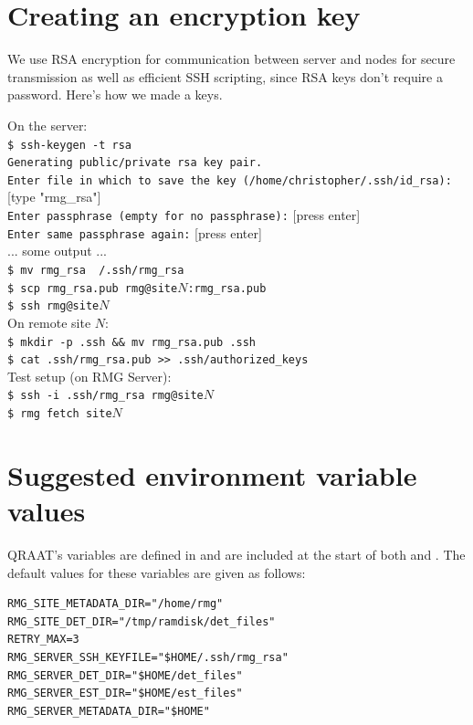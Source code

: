 \documentclass[letter]{article}
\begin{document}
\begin{appendices}
\section{Creating an encryption key}
We use RSA encryption for communication between server and nodes for secure transmission
as well as efficient SSH scripting, since RSA keys don't require a password. 
Here's how we made a keys.

On the server:\\
\texttt{\$ ssh-keygen -t rsa}\\
\texttt{Generating public/private rsa key pair.}\\
\texttt{Enter file in which to save the key (/home/christopher/.ssh/id\_rsa):} [type "rmg\_rsa"]\\
\texttt{Enter passphrase (empty for no passphrase):} [press enter]\\
\texttt{Enter same passphrase again:} [press enter]\\
   ... some output ... \\
\texttt{\$ mv rmg\_rsa ~/.ssh/rmg\_rsa}\\
\texttt{\$ scp rmg\_rsa.pub rmg@site}$N$\texttt{:rmg\_rsa.pub}\\
\texttt{\$ ssh rmg@site}$N$\\

On remote site $N$:\\
\texttt{\$ mkdir -p .ssh \&\& mv rmg\_rsa.pub .ssh}\\
\texttt{\$ cat .ssh/rmg\_rsa.pub >> .ssh/authorized\_keys}\\

Test setup (on RMG Server):\\
\texttt{\$ ssh -i .ssh/rmg\_rsa rmg@site}$N$\\
\texttt{\$ rmg fetch site}$N$\\

\section{Suggested environment variable values}
QRAAT's variables are defined in  and are included at the start of both 
 and . The default values for these variables are given as 
follows: 

\begin{verbatim}
RMG_SITE_METADATA_DIR="/home/rmg"
RMG_SITE_DET_DIR="/tmp/ramdisk/det_files"
RETRY_MAX=3
RMG_SERVER_SSH_KEYFILE="$HOME/.ssh/rmg_rsa"
RMG_SERVER_DET_DIR="$HOME/det_files"
RMG_SERVER_EST_DIR="$HOME/est_files"
RMG_SERVER_METADATA_DIR="$HOME"
\end{verbatim}

\end{appendices}
\end{document}

